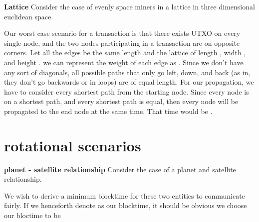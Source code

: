 \documentclass[conference]{IEEEtran}
\begin{document}
\textbf{Lattice} Consider the case of evenly space miners in a lattice in three dimensional euclidean space. 
\begin{center}
\end{center}
Our worst case scenario for a transaction is that there exists UTXO on every single node, and the two nodes participating in a transaction are on opposite corners. Let all the edges be the same length and the lattice of length , width , and height . we can represent the weight of each edge as . Since we don't have any sort of diagonals, all possible paths that only go left, down, and back (as in, they don't go backwards or in loops) are of equal length. For our propagation, we have to consider every shortest path from the starting node. Since every node is on a shortest path, and every shortest path is equal, then every node will be propagated to the end node at the same time. That time would be .

\section{rotational scenarios}
\textbf{planet - satellite relationship}
Consider the case of a planet and satellite relationship.

\begin{center}
\end{center}
We wish to derive a minimum blocktime for these two entities to communicate fairly. If we henceforth denote  as our blocktime, it should be obvious we choose our bloctime to be 
\end{document}
